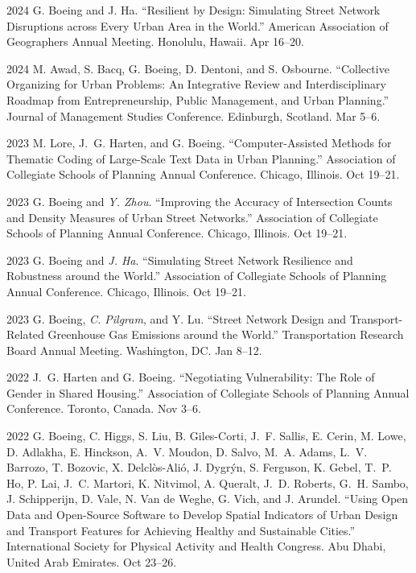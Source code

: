 \documentclass[11pt,letterpaper]{report} %
\begin{document}
\begin{tablist}
        \item[2024] \tab{}G. Boeing and J. Ha. \enquote{Resilient by Design: Simulating Street Network Disruptions across Every Urban Area in the World.} American Association of Geographers Annual Meeting. Honolulu, Hawaii. Apr 16--20.

        \item[2024] \tab{}M. Awad, S. Bacq, G. Boeing, D. Dentoni, and S. Osbourne. \enquote{Collective Organizing for Urban Problems: An Integrative Review and Interdisciplinary Roadmap from Entrepreneurship, Public Management, and Urban Planning.} Journal of Management Studies Conference. Edinburgh, Scotland. Mar 5--6.

        \item[2023] \tab{}M. Lore, J.~G. Harten, and G. Boeing. \enquote{Computer-Assisted Methods for Thematic Coding of Large-Scale Text Data in Urban Planning.} Association of Collegiate Schools of Planning Annual Conference. Chicago, Illinois. Oct 19--21.

        \item[2023] \tab{}G. Boeing and \textit{Y. Zhou}. \enquote{Improving the Accuracy of Intersection Counts and Density Measures of Urban Street Networks.} Association of Collegiate Schools of Planning Annual Conference. Chicago, Illinois. Oct 19--21.

        \item[2023] \tab{}G. Boeing and \textit{J. Ha}. \enquote{Simulating Street Network Resilience and Robustness around the World.} Association of Collegiate Schools of Planning Annual Conference. Chicago, Illinois. Oct 19--21.

        \item[2023] \tab{}G. Boeing, \textit{C. Pilgram}, and Y. Lu. \enquote{Street Network Design and Transport-Related Greenhouse Gas Emissions around the World.} Transportation Research Board Annual Meeting. Washington, DC\@. Jan 8--12.

        \item[2022] \tab{}J.~G. Harten and G. Boeing. \enquote{Negotiating Vulnerability: The Role of Gender in Shared Housing.} Association of Collegiate Schools of Planning Annual Conference. Toronto, Canada. Nov 3--6.

        \item[2022] \tab{}G. Boeing, C. Higgs, S. Liu, B. Giles-Corti, J.~F. Sallis, E. Cerin, M. Lowe, D. Adlakha, E. Hinckson, A.~V. Moudon, D. Salvo, M.~A. Adams, L.~V. Barrozo, T. Bozovic, X. Delclòs-Alió, J. Dygrýn, S. Ferguson, K. Gebel, T.~P. Ho, P. Lai, J.~C. Martori, K. Nitvimol, A. Queralt, J.~D. Roberts, G.~H. Sambo, J. Schipperijn, D. Vale, N. Van de Weghe, G. Vich, and J. Arundel. \enquote{Using Open Data and Open-Source Software to Develop Spatial Indicators of Urban Design and Transport Features for Achieving Healthy and Sustainable Cities.} International Society for Physical Activity and Health Congress. Abu Dhabi, United Arab Emirates. Oct 23--26.


\end{tablist}
\end{document}
